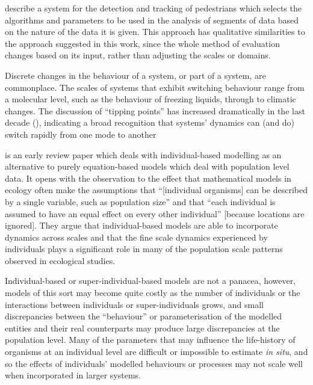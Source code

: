 \Cite{DBLP:ZhangZR16} describe a system for the detection and tracking
of pedestrians which selects the algorithms and parameters to be used
in the analysis of segments of data based on the nature of the data it
is given. This approach has qualitative similarities to the approach
suggested in this work, since the whole method of evaluation changes
based on its input, rather than adjusting the scales or domains.

Discrete changes in the behaviour of a system, or part of a system,
are commonplace. The scales of systems that exhibit switching
behaviour range from a molecular level, such as the behaviour of
freezing liquids, through to climatic changes.  The discussion of
``tipping points'' has increased dramatically in the last decade
(\citep{bhatanacharoentipping}), indicating a broad recognition that
systems' dynamics can (and do) switch rapidly from one mode to another

\Cite{huston1988new} is an early review paper which deals with
individual-based modelling as an alternative to purely equation-based
models which deal with population level data.  It opens with the
observation to the effect that mathematical models in ecology often
make the assumptions that ``[individual organisms] can be described by
a single variable, such as population size'' and that ``each
individual is assumed to have an equal effect on every other
individual'' [because locations are ignored]. They argue that
individual-based models are able to incorporate dynamics across scales
and that the fine scale dynamics experienced by individuals plays a
significant role in many of the population scale patterns observed in
ecological studies.

Individual-based or super-individual-based models are not a panacea,
however, models of this sort may become quite costly as the number of
individuals or the interactions between individuals or
super-individuals grows, and small discrepancies between the
``behaviour'' or parameterisation of the modelled entities and their
real counterparts may produce large discrepancies at the population
level. Many of the parameters that may influence the life-history of
organisms at an individual level are difficult or impossible to
estimate \emph{in situ}, and so the effects of individuals' modelled
behaviours or processes may not scale well when incorporated in larger
systems.

